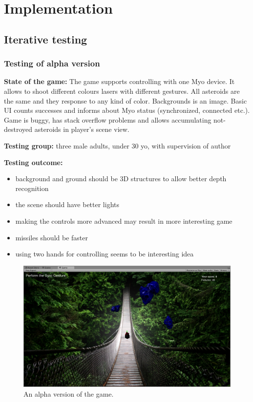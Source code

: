 \chapter{Implementation}


\section{Iterative testing}
\subsection{Testing of alpha version}


\textbf{State of the game:} The game supports controlling with one Myo device. It allows to shoot different colours lasers with different gestures. All asteroids are the same and they response to any kind of color. Backgrounds is an image. Basic UI counts successes and informs about Myo status (synchronized, connected etc.). Game is buggy, has stack overflow problems and allows accumulating not-destroyed asteroids in player's scene view.

\textbf{Testing group:} three male adults, under 30 yo, with supervision of author

\textbf{Testing outcome:} 

\begin{itemize}
\item background and ground should be 3D structures to allow better depth recognition
\item the scene should have better lights
\item making the controls more advanced may result in more interesting game
\item missiles should be faster
\item using two hands for controlling seems to be interesting idea
\end{itemize}
\begin{figure}
\includegraphics[width=\textwidth]{graphics/screen_v1.png} 
\caption{An alpha version of the game.}
\end{figure}
